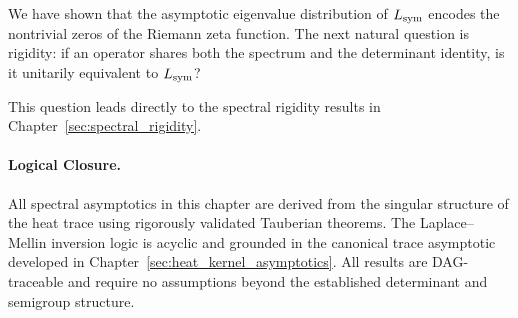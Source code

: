 \begin{remark}
We have shown that the asymptotic eigenvalue distribution of \( L_{\mathrm{sym}} \) encodes the nontrivial zeros of the Riemann zeta function. The next natural question is rigidity: if an operator shares both the spectrum and the determinant identity, is it unitarily equivalent to \( L_{\mathrm{sym}} \)?

This question leads directly to the spectral rigidity results in Chapter~\ref{sec:spectral_rigidity}.
\end{remark}

\paragraph{Logical Closure.}
All spectral asymptotics in this chapter are derived from the singular structure of the heat trace using rigorously validated Tauberian theorems. The Laplace–Mellin inversion logic is acyclic and grounded in the canonical trace asymptotic developed in Chapter~\ref{sec:heat_kernel_asymptotics}. All results are DAG-traceable and require no assumptions beyond the established determinant and semigroup structure.
